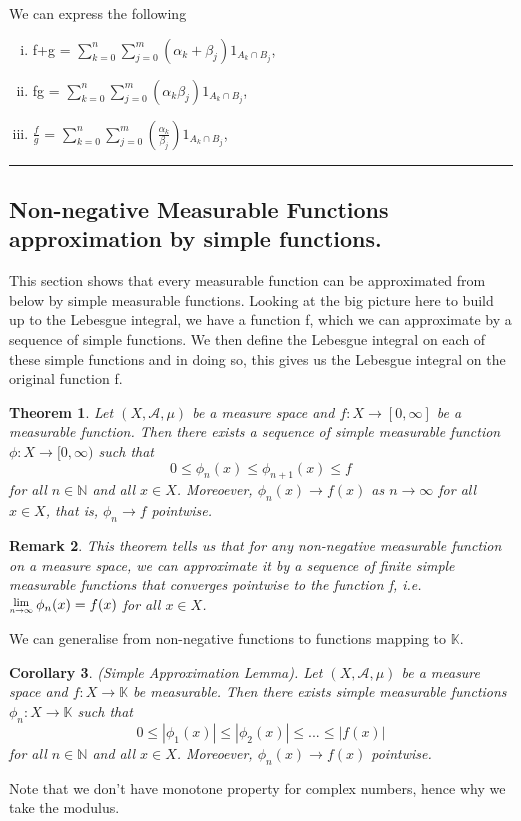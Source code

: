\documentclass[twoside]{article}
\newcounter{lecnum}
\newcommand{\Lim}[1]{\raisebox{0.5ex}{\scalebox{0.8}{$\displaystyle \lim_{#1}\;$}}}
\newtheorem{theorem}{Theorem}[lecnum]
\newtheorem{corollary}[theorem]{Corollary}
\newtheorem{remark}[theorem]{Remark}
\newenvironment{proof}{{\bf Proof:}}{\hfill\rule{2mm}{2mm}}
\begin{document}
\begin{proof}
We can express the following 
\begin{enumerate}[(i)]
  \item f+g = $\sum_{k=0}^n\sum_{j=0}^m(\alpha_k + \beta_j)1_{A_k\cap B_j}$, 
  \item fg = $\sum_{k=0}^n\sum_{j=0}^m(\alpha_k \beta_j)1_{A_k\cap B_j}$, 
  \item $\frac{f}{g}$ = $\sum_{k=0}^n\sum_{j=0}^m(\frac{\alpha_k}{\beta_j})1_{A_k\cap B_j}$, 
\end{enumerate}
\end{proof}

\subsection{Non-negative Measurable Functions approximation by simple functions.}

This section shows that every measurable function can be approximated from below by simple measurable functions. Looking at the big picture here to build up to the Lebesgue integral, we have a function f, which we can approximate by a sequence of simple functions. We then define the Lebesgue integral on each of these simple functions and in doing so, this gives us the Lebesgue integral on the original function f.

\begin{theorem}
Let $(X, \mathcal{A}, \mu)$ be a measure space and $f: X \rightarrow [0, \infty]$ be a measurable function. Then there exists a sequence of simple measurable function $\phi: X \rightarrow [0, \infty)$ such that
$$
0 \leq \phi_n(x) \leq \phi_{n+1}(x) \leq f
$$
for all $n \in \mathbb{N}$ and all $x \in X$. Moreoever, $\phi_n(x) \rightarrow f(x)$ as $n \rightarrow \infty$ for all $x \in X$, that is, $\phi_n \rightarrow f$ pointwise.
\end{theorem}

\begin{remark}
This theorem tells us that for any non-negative measurable function on a measure space, we can approximate it by a sequence of finite simple measurable functions that converges pointwise to the function f, i.e. $\Lim{n \rightarrow \infty}\phi_n(x) = f(x)$ for all $x \in X$.
\end{remark}

We can generalise from non-negative functions to functions mapping to $\mathbb{K}$.

\begin{corollary}
(Simple Approximation Lemma). Let $(X, \mathcal{A}, \mu)$ be a measure space and $f: X \rightarrow \mathbb{K}$ be measurable. Then there exists simple measurable functions $\phi_n: X \rightarrow \mathbb{K}$ such that
$$
0 \leq |\phi_1(x)| \leq |\phi_{2}(x)| \leq ... \leq |f(x)|
$$
for all $n \in \mathbb{N}$ and all $x \in  X$. Moreoever, $\phi_n(x) \rightarrow f(x)$ pointwise.
\end{corollary}
Note that we don't have monotone property for complex numbers, hence why we take the modulus.
\end{document}
